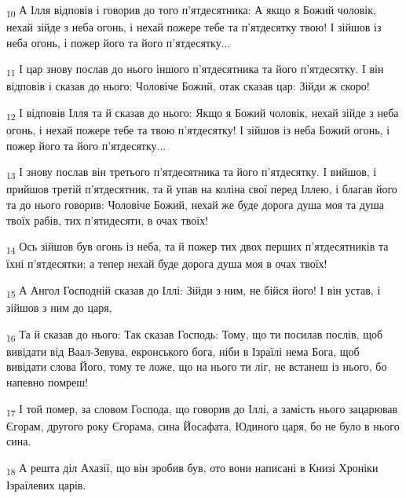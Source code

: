 \begin{tcolorbox}
\textsubscript{10} А Ілля відповів і говорив до того п'ятдесятника: А якщо я Божий чоловік, нехай зійде з неба огонь, і нехай пожере тебе та п'ятдесятку твою! І зійшов із неба огонь, і пожер його та його п'ятдесятку...
\end{tcolorbox}
\begin{tcolorbox}
\textsubscript{11} І цар знову послав до нього іншого п'ятдесятника та його п'ятдесятку. І він відповів і сказав до нього: Чоловіче Божий, отак сказав цар: Зійди ж скоро!
\end{tcolorbox}
\begin{tcolorbox}
\textsubscript{12} І відповів Ілля та й сказав до нього: Якщо я Божий чоловік, нехай зійде з неба огонь, і нехай пожере тебе та твою п'ятдесятку! І зійшов із неба Божий огонь, і пожер його та його п'ятдесятку...
\end{tcolorbox}
\begin{tcolorbox}
\textsubscript{13} І знову послав він третього п'ятдесятника та його п'ятдесятку. І вийшов, і прийшов третій п'ятдесятник, та й упав на коліна свої перед Іллею, і благав його та до нього говорив: Чоловіче Божий, нехай же буде дорога душа моя та душа твоїх рабів, тих п'ятидесяти, в очах твоїх!
\end{tcolorbox}
\begin{tcolorbox}
\textsubscript{14} Ось зійшов був огонь із неба, та й пожер тих двох перших п'ятдесятників та їхні п'ятдесятки; а тепер нехай буде дорога душа моя в очах твоїх!
\end{tcolorbox}
\begin{tcolorbox}
\textsubscript{15} А Ангол Господній сказав до Іллі: Зійди з ним, не бійся його! І він устав, і зійшов з ним до царя,
\end{tcolorbox}
\begin{tcolorbox}
\textsubscript{16} Та й сказав до нього: Так сказав Господь: Тому, що ти посилав послів, щоб вивідати від Ваал-Зевува, екронського бога, ніби в Ізраїлі нема Бога, щоб вивідати слова Його, тому те ложе, що на нього ти ліг, не встанеш із нього, бо напевно помреш!
\end{tcolorbox}
\begin{tcolorbox}
\textsubscript{17} І той помер, за словом Господа, що говорив до Іллі, а замість нього зацарював Єгорам, другого року Єгорама, сина Йосафата, Юдиного царя, бо не було в нього сина.
\end{tcolorbox}
\begin{tcolorbox}
\textsubscript{18} А решта діл Ахазії, що він зробив був, ото вони написані в Книзі Хроніки Ізраїлевих царів.
\end{tcolorbox}

